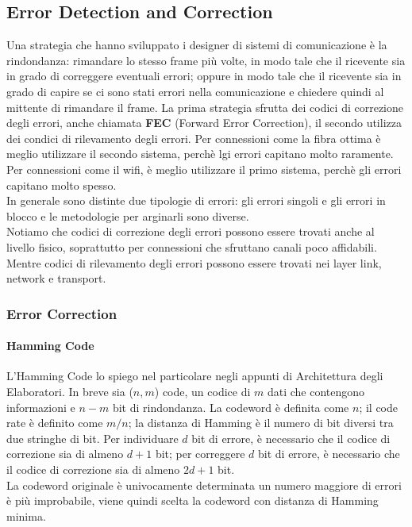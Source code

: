 \documentclass{article}
\begin{document}
\subsection{Error Detection and Correction}
Una strategia che hanno sviluppato i designer di sistemi di comunicazione è la
rindondanza: rimandare lo stesso frame più volte, in modo tale che il ricevente
sia in grado di correggere eventuali errori; oppure in modo tale che il
ricevente sia in grado di capire se ci sono stati errori nella comunicazione e
chiedere quindi al mittente di rimandare il frame.
La prima strategia sfrutta dei codici di correzione degli errori, anche chiamata
\textbf{FEC} (Forward Error Correction), il secondo utilizza dei condici di
rilevamento degli errori.
Per connessioni come la fibra ottima è meglio utilizzare il secondo sistema,
perchè lgi errori capitano molto raramente. Per connessioni come il wifi, è
meglio utilizzare il primo sistema, perchè gli errori capitano molto spesso.\\
In generale sono distinte due tipologie di errori: gli errori singoli e gli
errori in blocco e le metodologie per arginarli sono diverse.\\
Notiamo che codici di correzione degli errori possono essere trovati anche al
livello fisico, soprattutto per connessioni che sfruttano canali poco
affidabili. Mentre codici di rilevamento degli errori possono essere trovati nei
layer link, network e transport.

\subsubsection{Error Correction}
\paragraph{Hamming Code}
L'Hamming Code lo spiego nel particolare negli appunti di Architettura degli
Elaboratori.
In breve sia ($n, m$) code, un codice di $m$ dati che contengono informazioni e
$n-m$ bit di rindondanza. La codeword è definita come $n$; il code rate è
definito come $m/n$; la distanza di Hamming è il numero di bit diversi tra due
stringhe di bit. Per individuare $d$ bit di errore, è necessario che il codice di
correzione sia di almeno $d+1$ bit; per correggere $d$ bit di errore, è necessario
che il codice di correzione sia di almeno $2d+1$ bit.\\
La codeword originale è univocamente determinata un numero maggiore di errori è
più improbabile, viene quindi scelta la codeword con distanza di Hamming minima.
\end{document}
